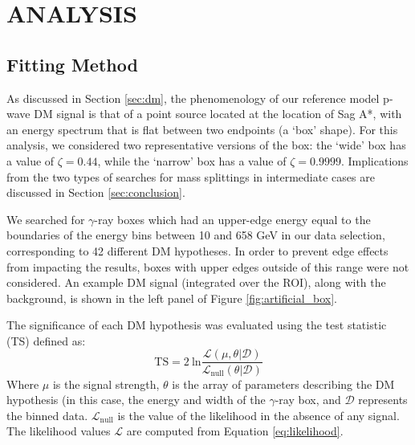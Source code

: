 
\section{ANALYSIS}\label{sec:analysis}


\subsection{Fitting Method}\label{sec:fitting}
As discussed in Section \ref{sec:dm}, the phenomenology of our reference model p-wave DM signal is that of a point source located at the location of Sag A*, with an energy spectrum that is flat between two endpoints (a `box' shape).
For this analysis, we considered two representative versions of the box: the `wide' box has a value of $\zeta = 0.44$, while the `narrow' box has a value of $\zeta = 0.9999$.
Implications from the two types of searches for mass splittings in intermediate cases are discussed in Section \ref{sec:conclusion}.

We searched for $\gamma$-ray boxes which had an upper-edge energy equal to the boundaries of the energy bins between 10 and 658 GeV in our data selection, corresponding to 42 different DM hypotheses.
In order to prevent edge effects from impacting the results, boxes with upper edges outside of this range were not considered. 
An example DM signal (integrated over the ROI), along with the background, is shown in the left panel of Figure \ref{fig:artificial_box}. 

The significance of each DM hypothesis was evaluated using the test statistic (TS) defined as: 
\begin{equation}
\mathrm{TS}=2~\mathrm{ln}\frac{\mathcal{L}(\mu, \theta | \mathcal{D})}{\mathcal{L}_{\mathrm{null}}(\theta | \mathcal{D})} \label{eq:ts}
\end{equation}
Where $\mu$ is the signal strength, $\theta$ is the array of parameters describing the DM hypothesis (in this case, the energy and width of the $\gamma$-ray box, and $\mathcal{D}$ represents the binned data. $\mathcal{L}_{\mathrm{null}}$ is the value of the likelihood in the absence of any signal.
The likelihood values $\mathcal{L}$ are computed from Equation \ref{eq:likelihood}.

